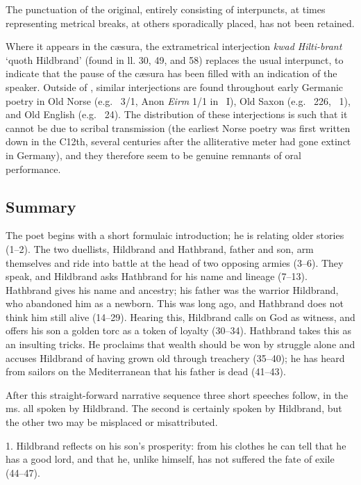 The punctuation of the original, entirely consisting of interpuncts, at times representing metrical breaks, at others sporadically placed, has not been retained.

Where it appears in the cæsura, the extrametrical interjection \emph{kwad Hilti-brant} ‘quoth Hildbrand’ (found in ll. 30, 49, and 58) replaces the usual interpunct, to indicate that the pause of the cæsura has been filled with an indication of the speaker.  Outside of \Hildebrandslied, similar interjections are found throughout early Germanic poetry in Old Norse (e.g. \Reginsmal\ 3/1, Anon \emph{Eirm} 1/1 in \Skp\ I), Old Saxon (e.g. \Heliand\ 226, \SaxonGenesis\ 1), and Old English (e.g. \Finnsburg\ 24).  The distribution of these interjections is such that it cannot be due to scribal transmission (the earliest Norse poetry was first written down in the C12th, several centuries after the alliterative meter had gone extinct in Germany), and they therefore seem to be genuine remnants of oral performance.

\subsection{Summary}

The poet begins with a short formulaic introduction; he is relating older stories (1–2).  The two duellists, Hildbrand and Hathbrand, father and son, arm themselves and ride into battle at the head of two opposing armies (3–6). They speak, and Hildbrand asks Hathbrand for his name and lineage (7–13). Hathbrand gives his name and ancestry; his father was the warrior Hildbrand, who abandoned him as a newborn. This was long ago, and Hathbrand does not think him still alive (14–29). Hearing this, Hildbrand calls on God as witness, and offers his son a golden torc as a token of loyalty (30–34). Hathbrand takes this as an insulting tricks. He proclaims that wealth should be won by struggle alone and accuses Hildbrand of having grown old through treachery (35–40); he has heard from sailors on the Mediterranean that his father is dead (41–43).

After this straight-forward narrative sequence three short speeches follow, in the ms. all spoken by Hildbrand. The second is certainly spoken by Hildbrand, but the other two may be misplaced or misattributed.

1. Hildbrand reflects on his son’s prosperity: from his clothes he can tell that he has a good lord, and that he, unlike himself, has not suffered the fate of exile (44–47).

